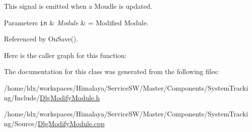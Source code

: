 \-This signal is emitted when a \-Moudle is updated. 


\begin{DoxyParams}[1]{\-Parameters}
\mbox{\tt in}  & {\em \-Module} & = \-Modified \-Module. \\
\hline
\end{DoxyParams}


\-Referenced by \-On\-Save().



\-Here is the caller graph for this function\-:




\-The documentation for this class was generated from the following files\-:\begin{DoxyCompactItemize}
\item 
/home/ldx/workspaces/\-Himalaya/\-Service\-S\-W/\-Master/\-Components/\-System\-Tracking/\-Include/\hyperlink{DlgModifyModule_8h}{\-Dlg\-Modify\-Module.\-h}\item 
/home/ldx/workspaces/\-Himalaya/\-Service\-S\-W/\-Master/\-Components/\-System\-Tracking/\-Source/\hyperlink{DlgModifyModule_8cpp}{\-Dlg\-Modify\-Module.\-cpp}\end{DoxyCompactItemize}
